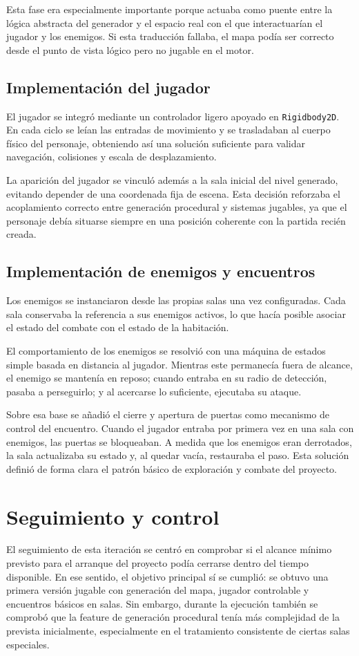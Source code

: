 Esta fase era especialmente importante porque actuaba como puente entre la lógica abstracta
del generador y el espacio real con el que interactuarían el jugador y los enemigos. Si
esta traducción fallaba, el mapa podía ser correcto desde el punto de vista lógico pero no
jugable en el motor.

\subsection{Implementación del jugador}
El jugador se integró mediante un controlador ligero apoyado en \texttt{Rigidbody2D}. En
cada ciclo se leían las entradas de movimiento y se trasladaban al cuerpo físico del
personaje, obteniendo así una solución suficiente para validar navegación, colisiones y
escala de desplazamiento.

La aparición del jugador se vinculó además a la sala inicial del nivel generado, evitando
depender de una coordenada fija de escena. Esta decisión reforzaba el acoplamiento correcto
entre generación procedural y sistemas jugables, ya que el personaje debía situarse siempre
en una posición coherente con la partida recién creada.

\subsection{Implementación de enemigos y encuentros}
Los enemigos se instanciaron desde las propias salas una vez configuradas. Cada sala
conservaba la referencia a sus enemigos activos, lo que hacía posible asociar el estado del
combate con el estado de la habitación.

El comportamiento de los enemigos se resolvió con una máquina de estados simple basada en
distancia al jugador. Mientras este permanecía fuera de alcance, el enemigo se mantenía en
reposo; cuando entraba en su radio de detección, pasaba a perseguirlo; y al acercarse lo
suficiente, ejecutaba su ataque.

Sobre esa base se añadió el cierre y apertura de puertas como mecanismo de control del
encuentro. Cuando el jugador entraba por primera vez en una sala con enemigos, las puertas
se bloqueaban. A medida que los enemigos eran derrotados, la sala actualizaba su estado y,
al quedar vacía, restauraba el paso. Esta solución definió de forma clara el patrón básico
de exploración y combate del proyecto.

\section{Seguimiento y control}
El seguimiento de esta iteración se centró en comprobar si el alcance mínimo previsto para el
arranque del proyecto podía cerrarse dentro del tiempo disponible. En ese sentido, el objetivo
principal sí se cumplió: se obtuvo una primera versión jugable con generación del mapa,
jugador controlable y encuentros básicos en salas. Sin embargo, durante la ejecución también
se comprobó que la feature de generación procedural tenía más complejidad de la prevista
inicialmente, especialmente en el tratamiento consistente de ciertas salas especiales.

